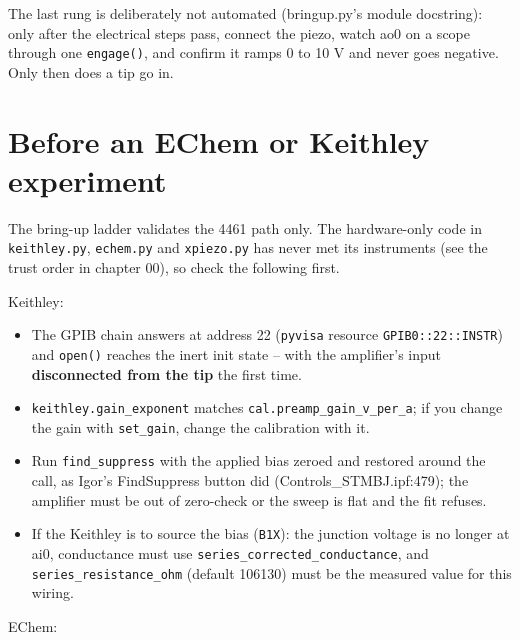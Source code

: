 The last rung is deliberately not automated (bringup.py's module docstring): only after the electrical steps pass, connect the piezo, watch ao0 on a scope through one \texttt{engage()}, and confirm it ramps 0 to 10 V and never goes negative. Only then does a tip go in.

\section{Before an EChem or Keithley experiment}

The bring-up ladder validates the 4461 path only. The hardware-only code in \texttt{keithley.\discretionary{}{}{}py}, \texttt{echem.\discretionary{}{}{}py} and \texttt{xpiezo.\discretionary{}{}{}py} has never met its instruments (see the trust order in chapter 00), so check the following first.

Keithley:

\begin{itemize}[leftmargin=*]
\item The GPIB chain answers at address 22 (\texttt{pyvisa} resource \texttt{GPIB0::22::INSTR}) and \texttt{open()} reaches the inert init state -- with the amplifier's input \textbf{disconnected from the tip} the first time.
\item \texttt{keithley.\discretionary{}{}{}gain\_\discretionary{}{}{}exponent} matches \texttt{cal.\discretionary{}{}{}preamp\_\discretionary{}{}{}gain\_\discretionary{}{}{}v\_\discretionary{}{}{}per\_\discretionary{}{}{}a}; if you change the gain with \texttt{set\_\discretionary{}{}{}gain}, change the calibration with it.
\item Run \texttt{find\_\discretionary{}{}{}suppress} with the applied bias zeroed and restored around the call, as Igor's FindSuppress button did (Controls\_STMBJ.ipf:479); the amplifier must be out of zero-check or the sweep is flat and the fit refuses.
\item If the Keithley is to source the bias (\texttt{B1X}): the junction voltage is no longer at ai0, conductance must use \texttt{series\_\discretionary{}{}{}corrected\_\discretionary{}{}{}conductance}, and \texttt{series\_\discretionary{}{}{}resistance\_\discretionary{}{}{}ohm} (default 106130) must be the measured value for this wiring.
\end{itemize}

EChem:

